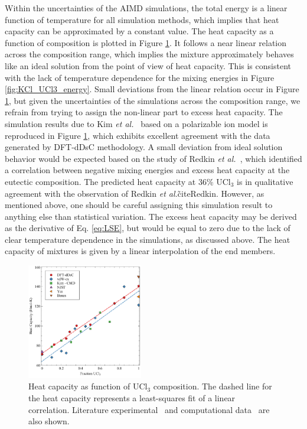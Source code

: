 \documentclass[preprint,3p,10pt,twocolumn,number,sort&compress]{elsarticle}
\begin{document}
Within the uncertainties of the AIMD simulations, the total energy is a linear function of temperature for all simulation methods, which implies that heat capacity can be approximated by a constant value. The heat capacity as a function of composition is plotted in Figure \ref{fig:heat_capacity}. It follows a near linear relation across the composition range, which implies the mixture approximately behaves like an ideal solution from the point of view of heat capacity. This is consistent with the lack of temperature dependence for the mixing energies in Figure \ref{fig:KCl_UCl3_energy}. Small deviations from the linear relation occur in Figure \ref{fig:heat_capacity}, but given the uncertainties of the simulations across the composition range, we refrain from trying to assign the non-linear part to excess heat capacity. The simulation results due to Kim \textit{et al.}~\cite{Kim} based on a polarizable ion model is reproduced in Figure \ref{fig:heat_capacity}, which exhibits excellent agreement with the data generated by DFT-dDsC methodology. A small deviation from ideal solution behavior would be expected based on the study of Redkin \textit{et al.}~\cite{Redkin}, which identified a correlation between negative mixing energies and excess heat capacity at the eutectic composition. The predicted heat capacity at 36\% UCl$_3$ is in qualitative agreement with the observation of Redkin \textit{et al.}\~cite{Redkin}. However, as mentioned above, one should be careful assigning this simulation result to anything else than statistical variation. The excess heat capacity may be derived as the derivative of Eq. \ref{eq:LSE}, but would be equal to zero due to the lack of clear temperature dependence in the simulations, as discussed above. The heat capacity of mixtures is given by a linear interpolation of the end members. 

\begin{figure}[htb]
\centering
\includegraphics[width=0.45\textwidth]{ben_fig3.pdf}
\caption{Heat capacity as function of UCl$_3$ composition. The dashed line for the heat capacity represents a least-squares fit of a linear correlation. Literature experimental~\cite{NIST,219851,YIN2020,BENES2008} and computational data~\cite{Kim} are also shown.}
\label{fig:heat_capacity}
\end{figure}
\end{document}
